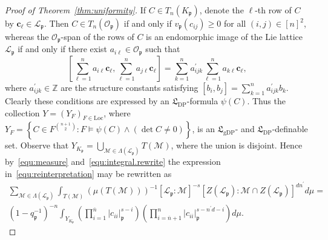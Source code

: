 \documentclass[11pt,a4paper]{amsart}
\theoremstyle{plain}
\theoremstyle{remark}
\newcommand{\Z}{\mathbb{Z}}
\newcommand{\p}{\mathfrak{p}}
\newcommand{\dimL}{n}
\def \p {\ensuremath{\mathfrak{p}}}
\begin{document}
\begin{proof}[Proof of Theorem~\ref{thm:uniformity}]
If $C \in T_\dimL (K_\p)$, denote the $\ell$-th row of $C$ by $\mathbf{c}_\ell \in \mathcal{L}_\p$.  Then $C \in T_\dimL (\mathcal{O}_\p)$ if and only if $v_\p (c_{ij}) \geq 0$ for all $(i,j) \in [\dimL]^2$, whereas the $\mathcal{O}_\p$-span of the rows of $C$ is an endomorphic image of the Lie lattice $\mathcal{L}_\p$ if and only if there exist $a_{i\ell} \in \mathcal{O}_\p$ such that
$$ \left[ \sum_{\ell = 1}^{\dimL} a_{i \ell} \mathbf{c}_\ell, \sum_{\ell = 1}^{\dimL} a_{j \ell} \mathbf{c}_{\ell} \right] = \sum_{k = 1}^{\dimL} a^\prime_{ijk} \sum_{\ell = 1}^{\dimL} a_{k \ell} \mathbf{c}_{\ell},$$
where $a^\prime_{ijk} \in \Z$ are the structure constants satisfying $[b_i, b_j] = \sum_{k = 1}^{\dimL} a^\prime_{ijk} b_k$.  Clearly these conditions are expressed by an $\mathfrak{L}_{\mathrm{DP}}$-formula $\psi(C)$.  Thus the collection $Y = (Y_F)_{F \in \mathrm{Loc}}$, where $Y_{F} = \left\{ C \in F^{\binom{\dimL + 1}{2}} : F \models \psi(C) \wedge (\det C \neq 0) \right\}$, is an $\mathfrak{L}_{\mathrm{gDP}}$- and $\mathfrak{L}_{\mathrm{DP}}$-definable set.
Observe that $Y_{K_\p} = \bigcup_{\mathcal{M} \in \Lambda(\mathcal{L}_\p)} T(\mathcal{M})$, where the union is disjoint.  Hence by~\eqref{equ:measure} and~\eqref{equ:integral.rewrite} the expression in~\eqref{equ:reinterpretation} may be rewritten as
\begin{multline} \label{equ:unif.integral}
\sum_{\mathcal{M} \in \Lambda(\mathcal{L}_\p)} \int_{T(\mathcal{M})} (\mu(T(\mathcal{M})))^{-1} [\mathcal{L}_\p : \mathcal{M}]^{-s} [Z(\mathcal{L}_\p) : \mathcal{M} \cap Z(\mathcal{L}_\p)]^{d \dimL^\prime} d \mu =
\\
(1 - q_\p^{-1})^{- \dimL} \int_{Y_{K_\p}} \left( \prod_{i = 1}^{\overline{\dimL}} |c_{ii} |_{\p}^{s - i} \right) \left( \prod_{i = \overline{\dimL} + 1}^{\dimL} |c_{ii} |_{\p}^{s - \dimL^\prime d - i} \right) d \mu.
\end{multline}



\end{proof}
\end{document}
